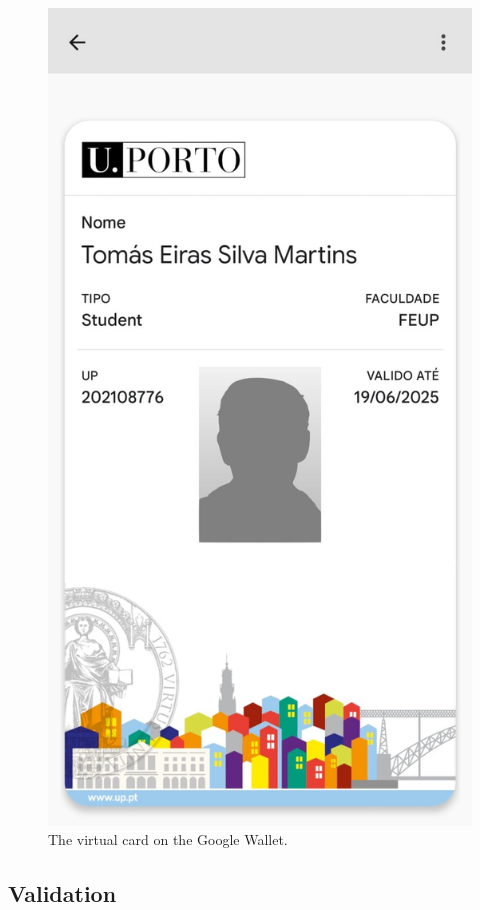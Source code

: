 \documentclass[12pt]{article}
\begin{document}
\begin{figure}[H]
	\centering
	\includegraphics[height=0.27\textheight,keepaspectratio]{card.jpeg}
	\caption{The virtual card on the Google Wallet.}
\end{figure}

\subsection{Validation}
\end{document}
